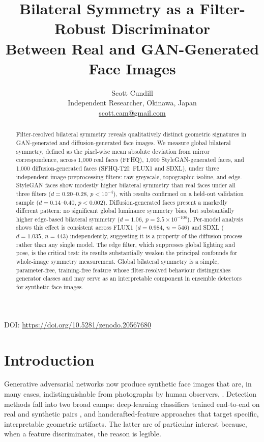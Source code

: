 \documentclass[11pt,a4paper]{article}
\title{\textbf{Bilateral Symmetry as a Filter-Robust Discriminator\\
Between Real and GAN-Generated Face Images}}
\author{Scott Cundill\\
\small Independent Researcher, Okinawa, Japan\\
\small \href{mailto:scott.cam@gmail.com}{scott.cam@gmail.com}}
\date{}
\begin{document}
\maketitle

\begin{center}
\small DOI: \url{https://doi.org/10.5281/zenodo.20567680}
\end{center}

\begin{abstract}
Filter-resolved bilateral symmetry reveals qualitatively distinct geometric
signatures in GAN-generated and diffusion-generated face images. We measure
global bilateral symmetry, defined as the pixel-wise mean absolute deviation from mirror
correspondence, across 1,000 real faces (FFHQ), 1,000 StyleGAN-generated
faces, and 1,000 diffusion-generated faces (SFHQ-T2I: FLUX1 and SDXL), under
three independent image-preprocessing filters: raw greyscale, topographic
isoline, and edge. StyleGAN faces show modestly higher bilateral symmetry than
real faces under all three filters ($d = 0.20$--$0.28$, $p < 10^{-4}$), with
results confirmed on a held-out validation sample ($d = 0.14$--$0.40$,
$p < 0.002$). Diffusion-generated faces present a markedly different pattern:
no significant global luminance symmetry bias, but substantially higher edge-based
bilateral symmetry ($d = 1.06$, $p = 2.5 \times 10^{-108}$). Per-model analysis
shows this effect is consistent across FLUX1 ($d = 0.984$, $n = 546$) and SDXL
($d = 1.035$, $n = 443$) independently, suggesting it is a property of the
diffusion process rather than any single model. The edge filter, which suppresses
global lighting and pose, is the critical test: its results substantially weaken
the principal confounds for whole-image symmetry measurement. Global bilateral
symmetry is a simple, parameter-free, training-free feature whose filter-resolved
behaviour distinguishes generator classes and may serve as an interpretable
component in ensemble detectors for synthetic face images.
\end{abstract}

\section{Introduction}

Generative adversarial networks now produce synthetic face images that are, in
many cases, indistinguishable from photographs by human observers,
\citep{goodfellow2014generative, karras2019style}. Detection methods fall into
two broad camps: deep-learning classifiers trained end-to-end on real and
synthetic pairs \citep{tolosana2022survey}, and handcrafted-feature approaches
that target specific, interpretable geometric artifacts. The latter are of
particular interest because, when a feature discriminates, the reason is
legible.
\end{document}
